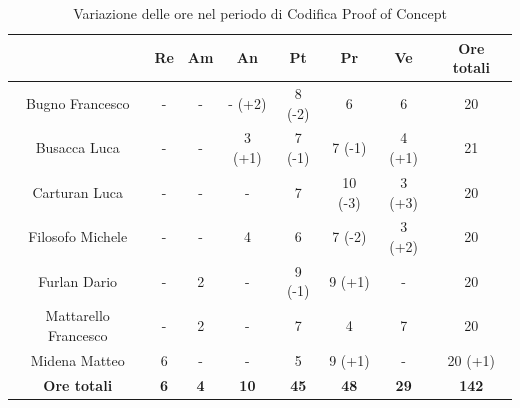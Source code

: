 \begin{table}[H]
  \centering
  \renewcommand{\arraystretch}{1.8}
  \begin{tabular}{c|c|c|c|c|c|c|c}
    \rowcolor[HTML]{125E28}
    \multicolumn{1}{c}{\color[HTML]{FFFFFF}\textbf{ Nominativo }}
                         & \multicolumn{1}{c}{\color[HTML]{FFFFFF}\textbf{ Re }}
                         & \multicolumn{1}{c}{\color[HTML]{FFFFFF}\textbf{ Am}}
                         & \multicolumn{1}{c}{\color[HTML]{FFFFFF}\textbf{ An }}
                         & \multicolumn{1}{c}{\color[HTML]{FFFFFF}\textbf{ Pt }}
                         & \multicolumn{1}{c}{\color[HTML]{FFFFFF}\textbf{ Pr }}
                         & \multicolumn{1}{c}{\color[HTML]{FFFFFF}\textbf{ Ve }}
                         & \multicolumn{1}{c}{\color[HTML]{FFFFFF}\textbf{ Ore totali }}                                                                                     \\
    \hline
    Bugno Francesco      & -                                                             & -          & - (+2)      & 8 (-2)      & 6           & 6           & 20           \\
    Busacca Luca         & -                                                             & -          & 3 (+1)      & 7 (-1)      & 7 (-1)      & 4 (+1)      & 21           \\
    Carturan Luca        & -                                                             & -          & -           & 7           & 10 (-3)     & 3 (+3)      & 20           \\
    Filosofo Michele     & -                                                             & -          & 4           & 6           & 7 (-2)      & 3 (+2)      & 20           \\
    Furlan Dario         & -                                                             & 2          & -           & 9 (-1)      & 9 (+1)      & -           & 20           \\
    Mattarello Francesco & -                                                             & 2          & -           & 7           & 4           & 7           & 20           \\
    Midena Matteo        & 6                                                             & -          & -           & 5           & 9 (+1)      & -           & 20 (+1)      \\
    \textbf{Ore totali}  & \textbf{6}                                                    & \textbf{4} & \textbf{10} & \textbf{45} & \textbf{48} & \textbf{29} & \textbf{142}
  \end{tabular}
  \caption{Variazione delle ore nel periodo di Codifica Proof of Concept}
\end{table}

